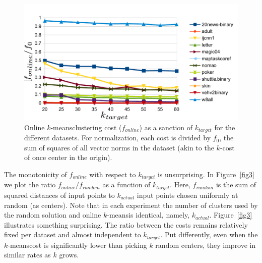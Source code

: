 \documentclass[11pt,twoside]{article}
\newcommand{\kmeans}{$k$-means}
\begin{document}
\begin{figure}[htbp]
\begin{center}
\includegraphics{figures/plot2.pdf}
\caption{Online \kmeans clustering cost ($f_{online}$) as a sanction of $k_{target}$ for the different datasets.
For normalization, each cost is divided by $f_0$, the sum of squares of all vector norms in the dataset (akin to the $k$-cost of once center in the origin).}
\label{fig2}
\end{center}
\end{figure}

The monotonicity of $f_{online}$ with respect to $k_{target}$ is unsurprising.
In Figure~\ref{fig3} we plot the ratio $f_{online}/f_{random}$ as a function of $k_{target}$.
Here, $f_{random}$ is the sum of squared distances of input points to $k_{actual}$  input points chosen uniformly at random (as centers).
Note that in each experiment the number of clusters used by the random solution and online \kmeans is identical, namely, $k_{actual}$.
Figure~\ref{fig3} illustrates something surprising. The ratio between the costs remains relatively fixed per dataset and almost independent to $k_{target}$.
Put differently, even when the \kmeans cost is significantly lower than picking $k$ random centers, they improve in similar rates as $k$ grows.
\end{document}
